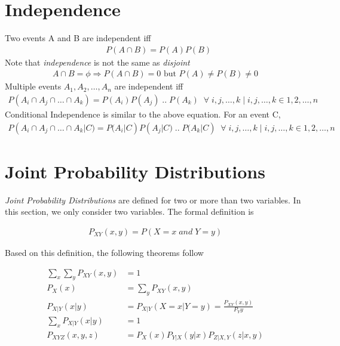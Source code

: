 \documentclass[../probability-notes.tex]{subfiles}
\begin{document}
    \section{Independence}
    Two events A and B are independent iff
    \begin{align*}
        &P(A \cap B) = P(A) P(B)
    \end{align*}
    Note that \emph{independence} is not the same as \emph{disjoint}
    \begin{align*}
    A \cap B = \phi \Rightarrow P(A \cap B) = 0 \text{ but } P(A) \neq P(B) \neq 0
    \end{align*}
    Multiple events $A_{1}, A_{2}, \ldots , A_{n}$ are independent iff
    \begin{align*}
        P(A_{i} \cap A_{j} \cap \ldots \cap A_{k}) = P(A_{i}) P(A_{j}) \;..\; P(A_{k}) \;\;\forall\;i,j,\ldots,k \;|\; i,j,\ldots,k \in {1,2,\ldots,n}
    \end{align*}
    Conditional Independence is similar to the above equation. For an event C,
    \begin{align*}
        P(A_{i} \cap A_{j} \cap \ldots \cap A_{k} | C) = P(A_{i}|C) P(A_{j}|C) \;..\; P(A_{k}|C) \;\;\forall\;i,j,\ldots,k \;|\; i,j,\ldots,k \in {1,2,\ldots,n}
    \end{align*}

    \section{Joint Probability Distributions}
    \emph{Joint Probability Distributions} are defined for two or more than two variables. In this section, we only consider two variables. The formal definition is

    \begin{align*}
        P_{XY}(x, y) = P(X = x \;and\; Y = y)
    \end{align*}

    Based on this definition, the following theorems follow

    \begin{align*}
        \sum_{x} \sum_{y} P_{XY}(x,y) &= 1 \\
        P_{X}(x) &= \sum_{y} P_{XY}(x,y) \tag*{Marginal Probability} \\
        P_{X|Y}(x|y) &= P_{X|Y}(X=x|Y=y) = \frac{P_{XY}(x,y)}{P_{Y}{y}} \\
        \sum_{x} P_{X|Y}(x|y) &= 1 \tag*{Since Y is fixed and we sum over all X's} \\
        P_{XYZ}(x,y,z) &= P_{X}(x) P_{Y|X}(y|x) P_{Z|X,Y}(z|x,y) \tag*{Chain Rule}
    \end{align*}
\end{document}
